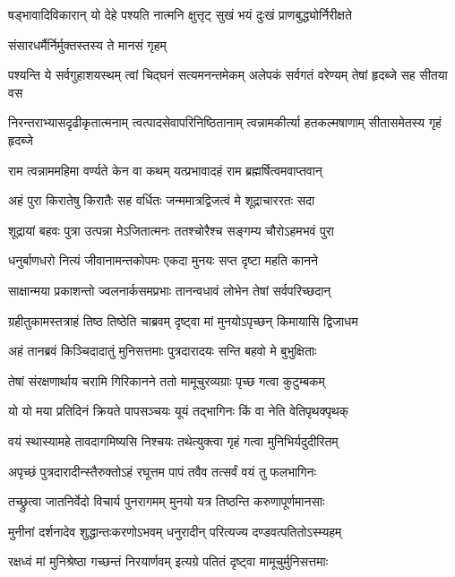 \twolineshloka
{षड्भावादिविकारान् यो देहे पश्यति नात्मनि}
{क्षुत्तृट् सुखं भयं दुःखं प्राणबुद्ध्योर्निरीक्षते} %

\onelineshloka
{संसारधर्मैर्निर्मुक्तस्तस्य ते मानसं गृहम्} %

\fourlineindentedshloka
{पश्यन्ति ये सर्वगुहाशयस्थम्}
{त्वां चिद्घनं सत्यमनन्तमेकम्}
{अलेपकं सर्वगतं वरेण्यम्}
{तेषां हृदब्जे सह सीतया वस} %

\fourlineindentedshloka
{निरन्तराभ्यासदृढीकृतात्मनाम्}
{त्वत्पादसेवापरिनिष्ठितानाम्}
{त्वन्नामकीर्त्या हतकल्मषाणाम्}
{सीतासमेतस्य गृहं हृदब्जे} %

\twolineshloka
{राम त्वन्नाममहिमा वर्ण्यते केन वा कथम्}
{यत्प्रभावादहं राम ब्रह्मर्षित्वमवाप्तवान्} %

\twolineshloka
{अहं पुरा किरातेषु किरातैः सह वर्धितः}
{जन्ममात्रद्विजत्वं मे शूद्राचाररतः सदा} %

\twolineshloka
{शूद्रायां बहवः पुत्रा उत्पन्ना मेऽजितात्मनः}
{ततश्चोरैश्च सङ्गम्य चौरोऽहमभवं पुरा} %

\twolineshloka
{धनुर्बाणधरो नित्यं जीवानामन्तकोपमः}
{एकदा मुनयः सप्त दृष्टा महति कानने} %

\twolineshloka
{साक्षान्मया प्रकाशन्तो ज्वलनार्कसमप्रभाः}
{तानन्वधावं लोभेन तेषां सर्वपरिच्छदान्} %

\twolineshloka
{ग्रहीतुकामस्तत्राहं तिष्ठ तिष्ठेति चाब्रवम्}
{दृष्ट्वा मां मुनयोऽपृच्छन् किमायासि द्विजाधम} %

\twolineshloka
{अहं तानब्रवं किञ्चिदादातुं मुनिसत्तमाः}
{पुत्रदारादयः सन्ति बहवो मे बुभुक्षिताः} %

\twolineshloka
{तेषां संरक्षणार्थाय चरामि गिरिकानने}
{ततो मामूचुरव्यग्राः पृच्छ गत्वा कुटुम्बकम्} %

\twolineshloka
{यो यो मया प्रतिदिनं क्रियते पापसञ्चयः}
{यूयं तद्भागिनः किं वा नेति वेतिपृथक्पृथक्} %

\twolineshloka
{वयं स्थास्यामहे तावदागमिष्यसि निश्चयः}
{तथेत्युक्त्वा गृहं गत्वा मुनिभिर्यदुदीरितम्} %

\twolineshloka
{अपृच्छं पुत्रदारादीन्स्तैरुक्तोऽहं रघूत्तम}
{पापं तवैव तत्सर्वं वयं तु फलभागिनः} %

\twolineshloka
{तच्छ्रुत्वा जातनिर्वेदो विचार्य पुनरागमम्}
{मुनयो यत्र तिष्ठन्ति करुणापूर्णमानसाः} %

\twolineshloka
{मुनीनां दर्शनादेव शुद्धान्तःकरणोऽभवम्}
{धनुरादीन् परित्यज्य दण्डवत्पतितोऽस्म्यहम्} %

\twolineshloka
{रक्षध्वं मां मुनिश्रेष्ठा गच्छन्तं निरयार्णवम्}
{इत्यग्रे पतितं दृष्ट्वा मामूचुर्मुनिसत्तमाः} %

